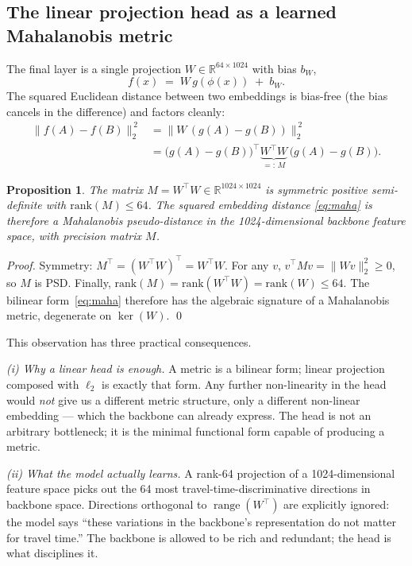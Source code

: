 \documentclass[11pt,a4paper]{article}
\newtheorem{proposition}{Proposition}
\begin{document}
\subsection{The linear projection head as a learned Mahalanobis metric}
\label{sec:mahalanobis}
The final layer is a single projection
$W \in \mathbb{R}^{64 \times 1024}$ with bias $b_W$,
\[
  f(x) \;=\; W\, g(\phi(x)) \;+\; b_W.
\]
The squared Euclidean distance between two embeddings is bias-free
(the bias cancels in the difference) and factors cleanly:
\begin{align}
  \|f(A) - f(B)\|_{2}^{\,2}
  &= \bigl\| W\,(g(A) - g(B)) \bigr\|_{2}^{\,2} \nonumber\\
  &= \bigl(g(A) - g(B)\bigr)^{\!\top}\!
     \underbrace{W^{\!\top} W}_{=:\,M}\,
     \bigl(g(A) - g(B)\bigr). \label{eq:maha}
\end{align}

\begin{proposition}
\label{prop:maha}
The matrix $M = W^{\top} W \in \mathbb{R}^{1024 \times 1024}$ is
symmetric positive semi-definite with $\mathrm{rank}(M) \leq 64$.
The squared embedding distance \eqref{eq:maha} is therefore a
\emph{Mahalanobis pseudo-distance} in the 1024-dimensional backbone
feature space, with precision matrix $M$.
\end{proposition}

\begin{proof}
Symmetry: $M^{\top} = (W^{\top} W)^{\top} = W^{\top} W$. For any
$v$, $v^{\top} M v = \|Wv\|_{2}^{2} \geq 0$, so $M$ is PSD.
Finally, $\mathrm{rank}(M) = \mathrm{rank}(W^{\top} W)
= \mathrm{rank}(W) \leq 64$. The bilinear form~\eqref{eq:maha}
therefore has the algebraic signature of a Mahalanobis metric,
degenerate on $\ker(W)$. \qed
\end{proof}

This observation has three practical consequences.

\emph{(i) Why a linear head is enough.} A metric is a bilinear form;
linear projection composed with $\ell_{2}$ is exactly that form. Any
further non-linearity in the head would \emph{not} give us a
different metric structure, only a different non-linear embedding
--- which the backbone can already express. The head is not an
arbitrary bottleneck; it is the minimal functional form capable of
producing a metric.

\emph{(ii) What the model actually learns.} A rank-64 projection of
a 1024-dimensional feature space picks out the 64 most
travel-time-discriminative directions in backbone space. Directions
orthogonal to $\operatorname{range}(W^{\top})$ are explicitly
ignored: the model says ``these variations in the backbone's
representation do not matter for travel time.'' The backbone is
allowed to be rich and redundant; the head is what disciplines it.
\end{document}
